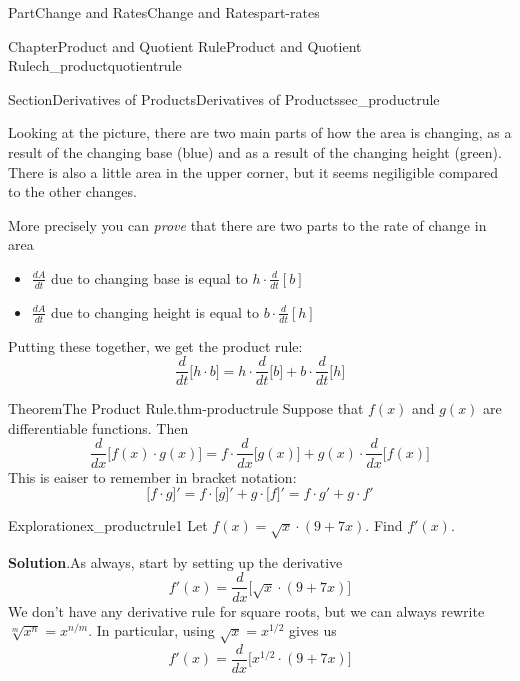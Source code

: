 \documentclass{tufte-book}
\newcommand{\blocktitlefont}{\relax}
\numberwithin{equation}{chapter}
\newcommand{\ddx}[1]{ \dfrac{d}{dx} \Big[ #1 \Big]  }
\begin{document}
\begin{partptx}{Part}{Change and Rates}{}{Change and Rates}{}{}{part-rates}
\begin{chapterptx}{Chapter}{Product and Quotient Rule}{}{Product and Quotient Rule}{}{}{ch_productquotientrule}
\begin{sectionptx}{Section}{Derivatives of Products}{}{Derivatives of Products}{}{}{sec_productrule}
\begin{image}{0.375}{0.25}{0.375}{}
{\begin{tikzpicture}
\end{tikzpicture}
}%
\end{image}%
Looking at the picture, there are two main parts of how the area is changing, as a result of the changing base (blue) and as a result of the changing height (green).  There is also a little area in the upper corner, but it seems negiligible compared to the other changes.%
\par
More precisely you can \emph{prove} that there are two parts to the rate of change in area%
\begin{itemize}[label=\textbullet]
\item{}\(\frac{dA}{dt}\) due to changing base is equal to \(h\cdot \frac{d}{dt}[b]\)%
\item{}\(\frac{dA}{dt}\) due to changing height is equal to \(b\cdot \frac{d}{dt}[h]\)%
\end{itemize}
Putting these together, we get the product rule:%
\begin{equation*}
\frac{d}{dt}\Big[h\cdot b\Big] = h\cdot \frac{d}{dt}\Big[b\Big] + b\cdot \frac{d}{dt}\Big[h\Big]
\end{equation*}
%
\begin{theorem}{Theorem}{The Product Rule.}{}{thm-productrule}%
Suppose that \(f(x)\) and \(g(x)\) are differentiable functions.  Then%
\begin{equation*}
\ddx{f(x)\cdot g(x)} = f\cdot \ddx{g(x)} + g(x) \cdot \ddx{f(x)}
\end{equation*}
This is eaiser to remember in bracket notation:%
\begin{equation*}
\Big[f\cdot g\Big]' = f\cdot \Big[g\Big]' + g\cdot \Big[f\Big]' 
= f\cdot g' + g\cdot f'
\end{equation*}
%
\end{theorem}
\begin{exploration}{Exploration}{}{ex_productrule1}%
Let \(f(x) = \sqrt{x} \cdot (9 + 7x) \). Find \(f'(x)\).%
\par\smallskip%
\noindent\textbf{\blocktitlefont Solution}.\hypertarget{ex_productrule1-2}{}\quad{}As always, start by setting up the derivative%
\begin{equation*}
f'(x) = \ddx{ \sqrt{x} \cdot (9 + 7x) } 
\end{equation*}
We don't have any derivative rule for square roots, but we can always rewrite \(\sqrt[m]{x^n} = x^{n/m}\).  In particular, using \(\sqrt{x} = x^{1/2}\) gives us%
\begin{equation*}
f'(x) = \ddx{ x^{1/2} \cdot (9 + 7x) } 
\end{equation*}

\end{exploration}
\end{sectionptx}
\end{chapterptx}
\end{partptx}
\end{document}
